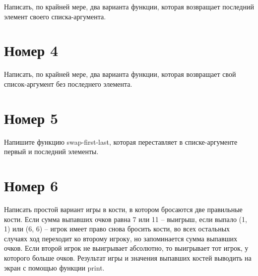 Написать, по крайней мере, два варианта функции, которая 
возвращает последний элемент своего списка-аргумента.

\begin{figure}[H]
    \begin{listingbox}{}
        
    \end{listingbox}
    \label{lst:3}
\end{figure}

\section{Номер 4}

Написать, по крайней мере, два варианта функции, которая 
возвращает свой список-аргумент без последнего элемента.

\begin{figure}[H]
    \begin{listingbox}{}
        
    \end{listingbox}
    \label{lst:4}
\end{figure}

\section{Номер 5}

Напишите функцию swap-first-last, которая переставляет 
в списке-аргументе первый и последний элементы.

\begin{figure}[H]
    \begin{listingbox}{}
        
    \end{listingbox}
    \label{lst:5}
\end{figure}

\section{Номер 6}

Написать простой вариант игры в кости, в котором бросаются две
правильные кости. Если сумма выпавших очков равна 7 или 11 -- выигрыш,
если выпало (1, 1) или (6, 6) -- игрок имеет право снова бросить 
кости, во всех остальных случаях ход переходит ко второму игроку,
но запоминается сумма выпавших очков. Если второй игрок не 
выигрывает абсолютно, то выигрывает тот игрок, у которого больше очков.
Результат игры и значения выпавших костей выводить на экран с помощью
функции print.

